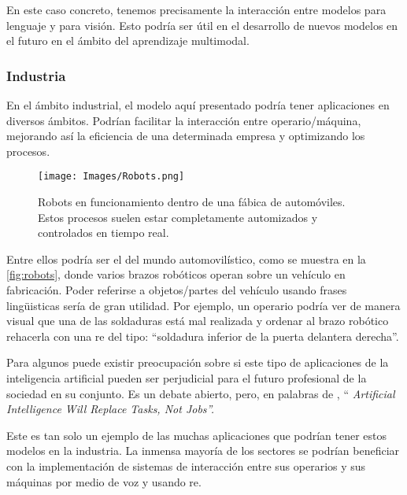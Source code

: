 En este caso concreto, tenemos precisamente la interacción entre modelos para
lenguaje y para visión. Esto podría ser útil en el desarrollo de nuevos modelos
en el futuro en el ámbito del aprendizaje multimodal.

\subsubsection{Industria}
En el ámbito industrial, el modelo aquí presentado podría tener aplicaciones en
diversos ámbitos. Podrían facilitar la interacción entre operario/máquina,
mejorando así la eficiencia de una determinada empresa y optimizando los
procesos.

\begin{figure}[ht]
  \centering
  \texttt{[image: Images/Robots.png]}
  \caption[Robots en fábrica de automóviles]{Robots en funcionamiento dentro de
    una fábica de automóviles. Estos procesos suelen estar completamente
    automizados y controlados en tiempo real.}
  \label{fig:robots}
\end{figure}

Entre ellos podría ser el del mundo automovilístico, como se
muestra en la \vref{fig:robots}, donde varios brazos robóticos operan sobre un
vehículo en fabricación. Poder referirse a objetos/partes del vehículo usando
frases lingüisticas sería de gran utilidad. Por ejemplo, un operario podría ver
de manera visual que una de las soldaduras está mal realizada y ordenar al
brazo robótico rehacerla con una \gls{re} del tipo: ``soldadura inferior de la
puerta delantera derecha''.

\begin{remarkBox}
  Para algunos puede existir preocupación sobre si este tipo de aplicaciones de
  la inteligencia artificial pueden ser perjudicial para el futuro profesional
  de la sociedad en su conjunto. Es un debate abierto, pero, en palabras de
  \citeauthor*{contributor18:artif_intel_will_replac_tasks_not_jobs}
  \cite{contributor18:artif_intel_will_replac_tasks_not_jobs}, ``\itshape
  Artificial Intelligence Will Replace Tasks, Not Jobs''.
\end{remarkBox}

Este es tan solo un ejemplo de las muchas aplicaciones que podrían tener estos
modelos en la industria. La inmensa mayoría de los sectores se podrían
beneficiar con la implementación de sistemas de interacción entre sus operarios
y sus máquinas por medio de voz y usando \gls{re}.

